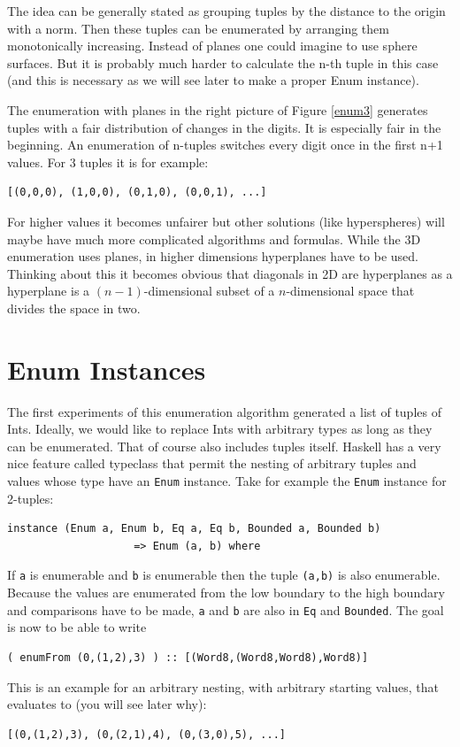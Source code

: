 \documentclass{tmr}
\newcommand{\authornote}[3]{{\color{#2} {\sc #1}: #3}}
\newcommand\bay[1]{\authornote{edward}{blue}{#1}}
\newcommand\tkv[1]{\authornote{Tillmann}{green}{#1}}
\begin{document}
The idea can be generally stated as grouping tuples by the distance to the origin with a norm. Then these tuples can be enumerated by arranging them monotonically increasing. Instead of planes one could imagine to use sphere surfaces. But it is probably much harder to calculate the n-th tuple in this case (and this is necessary as we will see later to make a proper Enum instance).

The enumeration with planes in the right picture of Figure \ref{enum3} generates tuples with a fair distribution of changes in the digits. It is especially fair in the beginning. An enumeration of n-tuples switches every digit once in the first n+1 values. For 3 tuples it is for example:
\begin{Verbatim}
[(0,0,0), (1,0,0), (0,1,0), (0,0,1), ...]
\end{Verbatim}
For higher values it becomes unfairer but other solutions (like hyperspheres) will maybe have much more complicated algorithms and formulas.
While the 3D enumeration uses planes, in higher dimensions hyperplanes have to be used. Thinking about this it becomes obvious that diagonals in 2D are hyperplanes as a hyperplane is a $(n-1)$-dimensional subset of a $n$-dimensional space that divides the space in two.

\section{Enum Instances}
The first experiments of this enumeration algorithm generated a list of tuples of Ints. Ideally, we would like to replace Ints with arbitrary types as long as they can be enumerated. That of course also includes tuples itself. Haskell has a very nice feature called typeclass that permit the nesting of arbitrary tuples and values whose type have an \verb|Enum| instance. Take for example the \verb|Enum| instance for 2-tuples:

\begin{Verbatim}
instance (Enum a, Enum b, Eq a, Eq b, Bounded a, Bounded b)
                    => Enum (a, b) where
\end{Verbatim}
If \verb|a| is enumerable and \verb|b| is enumerable then the tuple \verb|(a,b)| is also enumerable. Because the values are enumerated from the low boundary to the high boundary and comparisons have to be made, \verb|a| and \verb|b| are also in \verb|Eq| and \verb|Bounded|. %
The goal is now to be able to write
\begin{Verbatim}
( enumFrom (0,(1,2),3) ) :: [(Word8,(Word8,Word8),Word8)]
\end{Verbatim}
This is an example for an arbitrary nesting, with arbitrary starting values, that evaluates to (you will see later why):
\begin{Verbatim}
[(0,(1,2),3), (0,(2,1),4), (0,(3,0),5), ...]
\end{Verbatim}
\end{document}
